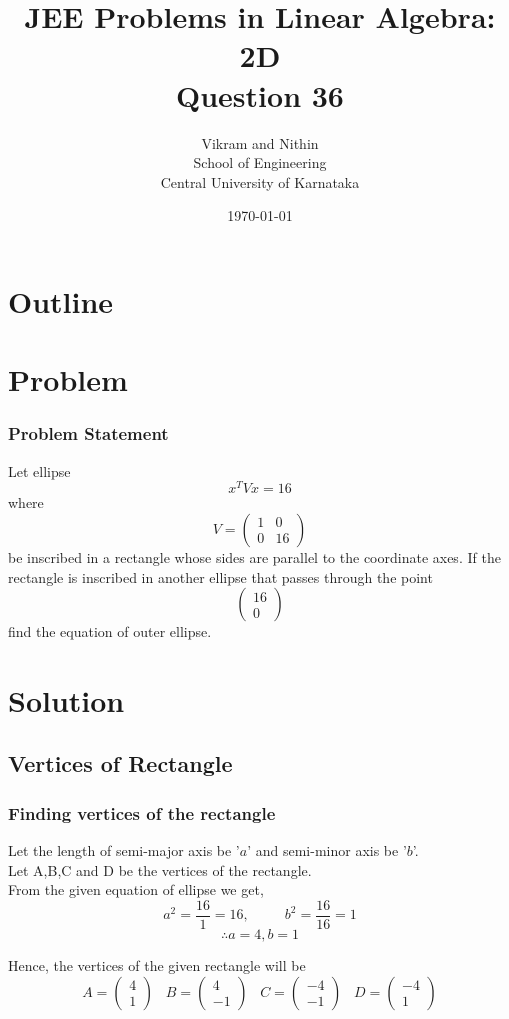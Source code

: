 \documentclass{beamer}
\title{JEE Problems in Linear Algebra: 2D\\Question 36}
\author{Vikram and Nithin\\School of Engineering\\Central University of Karnataka}
\date{\today}
\theoremstyle{remark}
\numberwithin{equation}{section}
\begin{document}
\begin{frame}
\titlepage
\end{frame}

\section*{Outline}
\begin{frame}
\tableofcontents
\end{frame}
\section{Problem}
\begin{frame}[t]
\frametitle{Problem Statement}
Let ellipse
\textbf{$$x^TVx = 16$$}
where
$$V = \begin{pmatrix}
1 & 0 \\
0 & 16
\end{pmatrix}$$
be inscribed in a rectangle whose sides are parallel to the coordinate axes.
If the rectangle is inscribed in another ellipse that passes through the point
$$ \begin{pmatrix}
16\\
0
\end{pmatrix}$$
find the equation of outer ellipse.
\end{frame}


\section{Solution}
\subsection{Vertices of Rectangle}
\begin{frame}[t]
\frametitle{Finding vertices of the rectangle}
Let the length of semi-major axis be '$a$' and semi-minor axis be '$b$'.\\
Let A,B,C and D be the vertices of the rectangle.\\
From the given equation of ellipse we get,\\
$$a^2 = \displaystyle{\frac{16}{1}} = 16,\hspace{30pt} b^2 = \displaystyle{\frac{16}{16}}= 1$$
$$\therefore a = 4, b = 1$$

Hence, the vertices of the given rectangle will be\\
$$
A = \begin{pmatrix}
4\\
1
\end{pmatrix} \hspace{10pt}
B = \begin{pmatrix}
4\\
-1
\end{pmatrix}\hspace{10pt}
C = \begin{pmatrix}
-4\\
-1
\end{pmatrix}\hspace{10pt}
D = \begin{pmatrix}
-4\\
1
\end{pmatrix}
$$
\end{frame}
\end{document}
